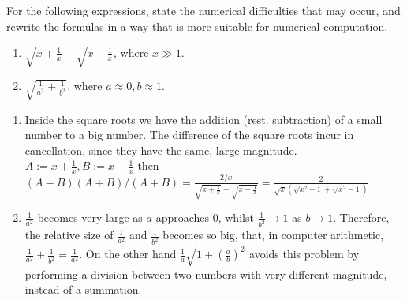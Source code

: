 \begin{problem}
\begin{subproblem}[2]
 \end{subproblem}

 \begin{subproblem}[2]
  For the following expressions, state the numerical difficulties that may occur, and rewrite the formulas in a way that is more suitable for numerical computation.
  \begin{enumerate}
   \item $\sqrt{x + \frac{1}{x}} - \sqrt{x - \frac{1}{x}}$, where $x \gg 1$.
   \item $\sqrt{\frac{1}{a^2} + \frac{1}{b^2}}$, where $a \approx 0, b \approx 1$.
  \end{enumerate}
  
  \begin{solution}
  \begin{enumerate}
   \item Inside the square roots we have the addition (rest. subtraction) of a small number to a big number. The difference of the square roots incur in cancellation, since they have the same, large magnitude. $A := x + \frac{1}{x}, B := x - \frac{1}{x}$ then $(A-B)(A+B)/(A+B) = \frac{2/x}{\sqrt{x + \frac{1}{x}} + \sqrt{x - \frac{1}{x}}} = \frac{2}{\sqrt{x} (\sqrt{x^2 + 1} + \sqrt{x^2 - 1})}$
   \item $\frac{1}{a^2}$ becomes very large as $a$ approaches $0$, whilst $\frac{1}{b^2} \rightarrow 1$ as $b \rightarrow 1$. Therefore, the relative size of $\frac{1}{a^2}$ and $\frac{1}{b^2}$ becomes so big, that, in computer arithmetic, $\frac{1}{a^2} + \frac{1}{b^2} = \frac{1}{a^2}$. On the other hand
   $\frac{1}{a}\sqrt{1+(\frac{a}{b})^{2}}$ avoids this problem by performing a division between two numbers with very different magnitude, instead of a summation.
  \end{enumerate}
  \end{solution}
 \end{subproblem}
\end{problem}
 
